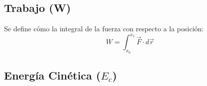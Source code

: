 \documentclass[../main.tex]{subfiles}
\begin{document}
\subsection{Trabajo (W)}
Se define cómo la integral de la fuerza con respecto a la posición:
\[ W = \int_{x_0}^{x_1} \vec{F} \cdot d \vec{r} \]
\subsection{Energía Cinética ($E_c$)}
\end{document}
